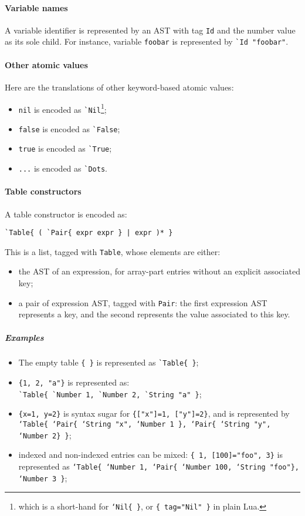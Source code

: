 \paragraph{Variable names}
A variable identifier is represented by an AST with tag \verb+Id+ and the
number value as its sole child. For instance, variable \verb+foobar+ is
represented by \verb+`Id "foobar"+.

\paragraph{Other atomic values}
Here are the translations of other keyword-based atomic values:
\begin{itemize}
\item \verb+nil+ is encoded as \verb+`Nil+\footnote{which is a
  short-hand for {\tt`Nil\{ \}}, or {\tt\{ tag="Nil" \}} in plain Lua.};
\item \verb+false+ is encoded as \verb+`False+;
\item \verb+true+ is encoded as \verb+`True+;
\item \verb+...+ is encoded as \verb+`Dots+.
\end{itemize}

\paragraph{Table constructors}
A table constructor is encoded as:

\verb+`Table{ ( `Pair{ expr expr } | expr )* }+

This is a list, tagged with \verb+Table+, whose elements are either:
\begin{itemize}
\item the AST of an expression, for array-part entries without an
  explicit associated key;
\item a pair of expression AST, tagged with \verb+Pair+: the first
  expression AST represents a key, and the second represents the value
  associated to this key.
\end{itemize}

\subparagraph{Examples}
\begin{itemize}

\item The empty table \verb+{ }+ is represented as \verb+`Table{ }+;

\item \verb+{1, 2, "a"}+ is represented as:\\
  \verb+`Table{ `Number 1, `Number 2, `String "a" }+;

\item \verb+{x=1, y=2}+ is syntax sugar for \verb+{["x"]=1, ["y"]=2}+,
  and is represented by {\tt`Table\{ `Pair\{ `String "x", `Number 1
    \}, `Pair\{ `String "y", `Number 2\} \}};

\item indexed and non-indexed entries can be mixed:
  \verb+{ 1, [100]="foo", 3}+ is represented as {\tt`Table\{ `Number
    1, `Pair\{ `Number 100, `String "foo"\}, `Number 3 \}};

\end{itemize}

